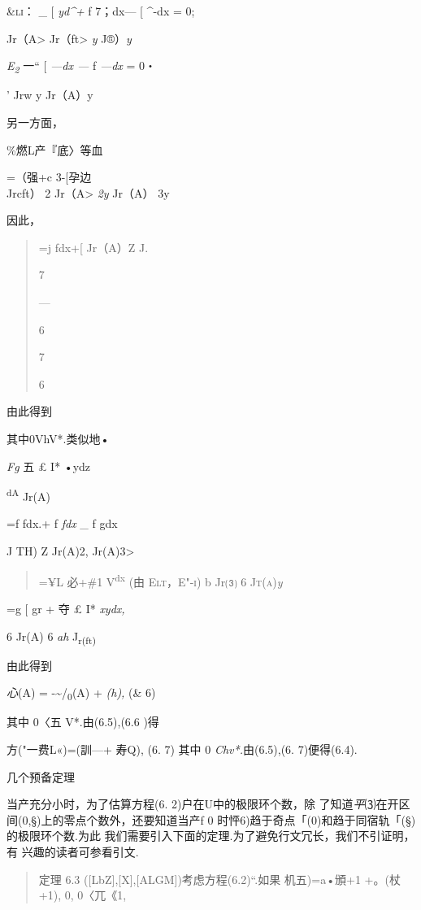 \documentclass{article}
\begin{document}
\textsc{\&li： \_ {[}} \emph{yd\^{}+} f 7；dx--- {[} \^{}-dx = 0;

Jr（A\textgreater{} Jr（ft\textgreater{} \emph{y} J®）\emph{y}

\emph{E\textsubscript{2}} 一`` {[} \emph{---dx ---} f \emph{---dx} = 0・

' Jrw y Jr（A）y

另一方面，

\%燃L产『底〉等血

=（强+c 3-{[}孕边\\
Jrcft） 2 Jr（A\textgreater{} \emph{2y} Jr（A） 3y

因此，

\begin{quote}
=j fdx+{[} Jr（A）Z J.

7

---

6

7

6
\end{quote}

由此得到

其中0VhV*.类似地•

\emph{Fg} 五 £ I* •ydz

\textsuperscript{dA} Jr(A)

=f fdx.+ f \emph{fdx} \_ f gdx

J TH) Z Jr(A)2, Jr(A)3\textgreater{}

\begin{quote}
=¥L 必+\#1 V\textsuperscript{dx} (由 \textsc{Elt，E"-i)} b Jr⑶ 6
\textsc{Jt(a)}\emph{y}
\end{quote}

=g {[} gr + 夺 £ I* \emph{xydx,}

6 Jr(A) 6 \emph{ah} J\textsubscript{r(ft)}

由此得到

\emph{心}(A) = -\textasciitilde{}/\textsubscript{0}(A) + \emph{(h),} (\&
6)

其中 0〈五 V*.由(6.5),(6.6 )得

方("一费L«)=(訓---+ 寿Q), (6. 7) 其中 0 \emph{Chv*.}由(6.5),(6.
7)便得(6.4). \textbar{}

几个预备定理

当产充分小时，为了估算方程(6. 2)户在U中的极限环个数，除
了知道\emph{平}⑶在开区间(0,§)上的零点个数外，还要知道当产f 0
时怦6)趋于奇点「(0)和趋于同宿轨「(§)的极限环个数.为此
我们需要引入下面的定理.为了避免行文冗长，我们不引证明，有
兴趣的读者可参看引文.

\begin{quote}
定理 6.3 ({[}LbZ{]},{[}X{]},{[}ALGM{]})考虑方程(6.2)``.如果 机五)=a•頒+1
+。(杖+1), 0, 0〈兀《1,
\end{quote}
\end{document}
